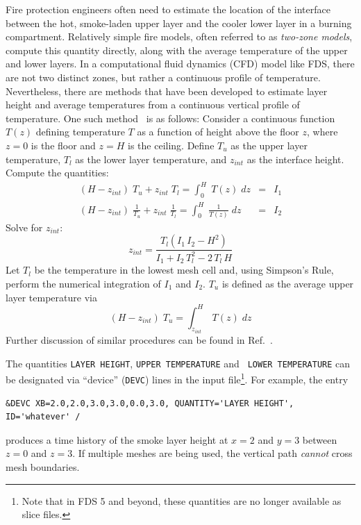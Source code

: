 \documentclass[11pt]{book}
\newcommand{\ct}{\tt\small}
\newcommand{\be}{\begin{equation}}
\newcommand{\ee}{\end{equation}}
\begin{document}
Fire protection engineers often need to estimate the location of the
interface between the hot, smoke-laden upper layer and the cooler
lower layer in a burning compartment.  Relatively simple fire models,
often referred to as {\em two-zone models}, compute this quantity
directly, along with the average temperature of the upper and lower
layers.  In a computational fluid dynamics (CFD) model like FDS, there
are not two distinct zones, but rather a continuous profile of
temperature. Nevertheless, there are methods that have been developed
to estimate layer height and average temperatures from a continuous
vertical profile of temperature. One such
method~\cite{Janssens:JFS1992} is as follows: Consider a continuous
function $T(z)$ defining temperature $T$ as a function of height above
the floor $z$, where $z=0$ is the floor and $z=H$ is the
ceiling. Define $T_u$ as the upper layer temperature, $T_l$ as the
lower layer temperature, and $z_{int}$ as the interface
height. Compute the quantities:
\begin{eqnarray*} (H-z_{int})\; T_u + z_{int} \; T_l = \int_0^H \; T(z) \; dz &=& I_1 \\
                  (H-z_{int})\; \frac{1}{T_u} + z_{int} \; \frac{1}{T_l} = \int_0^H \; \frac{1}{T(z)} \; dz &=& I_2 \end{eqnarray*}
Solve for $z_{int}$:
\be z_{int} = \frac{ T_l(I_1 \, I_2 - H^2)}{I_1+I_2 \, T_l^2 - 2\, T_l \, H} \ee
Let $T_l$ be the temperature in the lowest mesh cell and, using
Simpson's Rule, perform the numerical integration of $I_1$ and
$I_2$. $T_u$ is defined as the average upper layer temperature via
\be (H-z_{int})\; T_u = \int_{z_{int}}^H \; T(z) \; dz \ee
Further discussion of similar procedures can be found in Ref.~\cite{He:1}.

The quantities {\ct LAYER HEIGHT}, {\ct UPPER TEMPERATURE} and {\ct
LOWER TEMPERATURE} can be designated via ``device'' ({\ct DEVC}) lines
in the input file\footnote{Note that in FDS 5 and beyond, these
quantities are no longer available as slice files.}. For example, the
entry

\footnotesize
\begin{verbatim}
&DEVC XB=2.0,2.0,3.0,3.0,0.0,3.0, QUANTITY='LAYER HEIGHT', ID='whatever' /
\end{verbatim}
\normalsize

\noindent
produces a time history of the smoke layer height at $x=2$ and $y=3$ between $z=0$ and $z=3$.
If multiple meshes are being used, the vertical path {\em cannot} cross mesh boundaries.
\end{document}
